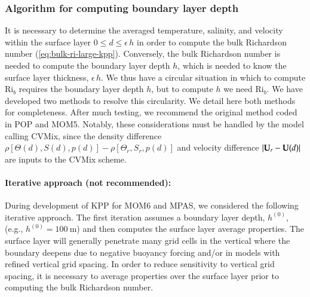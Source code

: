 \subsubsection{Algorithm for computing boundary layer depth}
\label{subsubsection:obldepth-algorithm}

It is necessary to determine the averaged temperature, salinity, and
velocity within the surface layer $0 \le d \le \epsilon \, h$ in order
to compute the bulk Richardson number (\ref{eq:bulk-ri-large-kpp}).
Conversely, the bulk Richardson number is needed to compute the
boundary layer depth $h$, which is needed to know the surface layer
thickness, $\epsilon \, h$.  We thus have a circular situation in
which to compute $\mbox{Ri}_{b}$ requires the boundary layer depth
$h$, but to compute $h$ we need $\mbox{Ri}_{b}$.  We have developed
two methods to resolve this circularity.  We detail here both methods
for completeness.  After much testing, we recommend the original
method coded in POP and MOM5.  Notably, these considerations must be
handled by the model calling CVMix, since the density difference
$\rho[\Theta(d), S(d), p(d)] - \rho[\Theta_{r}, S_{r}, p(d)]$ and
velocity difference $|{\bf U}_{r} - {\bf U}(d)|$ are inputs to the
CVMix scheme.


\paragraph{Iterative approach (not recommended):}
During development of KPP for MOM6 and MPAS, we considered the
following iterative approach. The first iteration assumes a boundary
layer depth, $h^{(0)}$, (e.g., $h^{(0)} = 100~\mbox{m}$) and then
computes the surface layer average properties.  The surface layer will
generally penetrate many grid cells in the vertical where the boundary
deepens due to negative buoyancy forcing and/or in models with refined
vertical grid spacing.  In order to reduce sensitivity to vertical
grid spacing, it is necessary to average properties over the surface
layer prior to computing the bulk Richardson number.

